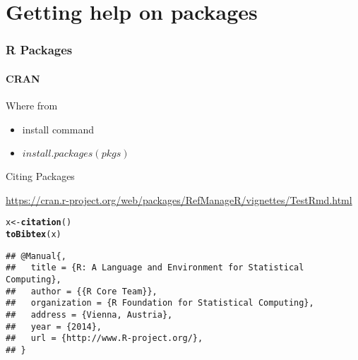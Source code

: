 \documentclass[12pt]{beamer}\usepackage[]{graphicx}\usepackage[]{color}
\makeatletter
\newcommand{\hlstd}[1]{\textcolor[rgb]{0.345,0.345,0.345}{#1}}%
\newcommand{\hlkwb}[1]{\textcolor[rgb]{0.69,0.353,0.396}{#1}}%
\newcommand{\hlkwd}[1]{\textcolor[rgb]{0.737,0.353,0.396}{\textbf{#1}}}%
\newenvironment{kframe}{%
 \def\at@end@of@kframe{}%
 \ifinner\ifhmode%
  \def\at@end@of@kframe{\end{minipage}}%
  \begin{minipage}{\columnwidth}%
 \fi\fi%
 \def\FrameCommand##1{\hskip\@totalleftmargin \hskip-\fboxsep
 \colorbox{shadecolor}{##1}\hskip-\fboxsep
     \hskip-\linewidth \hskip-\@totalleftmargin \hskip\columnwidth}%
 \MakeFramed {\advance\hsize-\width
   \@totalleftmargin\z@ \linewidth\hsize
   \@setminipage}}%
 {\par\unskip\endMakeFramed%
 \at@end@of@kframe}
\newenvironment{knitrout}{}{} %
\makeatother
\begin{document}
\section*{Getting help on packages}
\begin{frame}[fragile]
  \frametitle{R Packages}
  \framesubtitle{CRAN}
  
   \begin{block}{Where from}
  \begin{itemize} 
  \item install command
  \item $install.packages(pkgs)$
  \end{itemize}
  \end{block}
  
  \begin{block}{Citing Packages}

\url{https://cran.r-project.org/web/packages/RefManageR/vignettes/TestRmd.html}
  \end{block}
\begin{knitrout}
\color{fgcolor}\begin{kframe}
\begin{alltt}
 \hlstd{x}\hlkwb{<-}\hlkwd{citation}\hlstd{()}
 \hlkwd{toBibtex}\hlstd{(x)}
\end{alltt}
\begin{verbatim}
## @Manual{,
##   title = {R: A Language and Environment for Statistical Computing},
##   author = {{R Core Team}},
##   organization = {R Foundation for Statistical Computing},
##   address = {Vienna, Austria},
##   year = {2014},
##   url = {http://www.R-project.org/},
## }
\end{verbatim}
\end{kframe}
\end{knitrout}
\end{frame}
\end{document}
